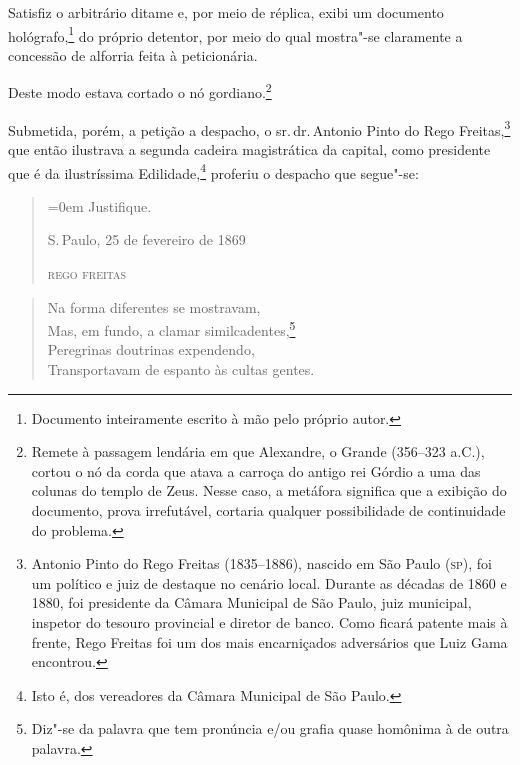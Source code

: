 Satisfiz o arbitrário ditame e, por meio de réplica, exibi um documento
hológrafo,\footnote{Documento inteiramente escrito à mão pelo próprio
  autor.} do próprio detentor, por meio do qual mostra"-se claramente a
concessão de alforria feita à peticionária.

Deste modo estava cortado o nó gordiano.\footnote{Remete à passagem \label{gordio}
  lendária em que Alexandre, o Grande (356--323 a.C.), cortou o nó da
  corda que atava a carroça do antigo rei Górdio a uma das colunas do
  templo de Zeus. Nesse caso, a metáfora significa que a exibição do
  documento, prova irrefutável, cortaria qualquer possibilidade de
  continuidade do problema.}

Submetida, porém, a petição a despacho, o sr.\,dr.\,Antonio Pinto do Rego
Freitas,\footnote{Antonio Pinto do Rego Freitas (1835--1886), nascido em
  São Paulo (\textsc{sp}), foi um político e juiz de destaque no cenário local.
  Durante as décadas de 1860 e 1880, foi presidente da Câmara Municipal
  de São Paulo, juiz municipal, inspetor do tesouro provincial e diretor
  de banco. Como ficará patente mais à frente, Rego Freitas foi um dos
  mais encarniçados adversários que Luiz Gama encontrou.} que então
ilustrava a segunda cadeira magistrática da capital, como presidente que
é da ilustríssima Edilidade,\footnote{Isto é, dos vereadores da Câmara
  Municipal de São Paulo.} proferiu o despacho que segue"-se:

\begin{quote}\parindent=0em
Justifique.

S.\,Paulo, 25 de fevereiro de 1869

\textsc{rego freitas}
\end{quote}


\begin{verse}
Na forma diferentes se mostravam,\\
Mas, em fundo, a clamar similcadentes,\footnote{Diz"-se da palavra que
  tem pronúncia e/ou grafia quase homônima à de outra palavra.}\\
Peregrinas doutrinas expendendo,\\
Transportavam de espanto às cultas gentes.
\end{verse}

